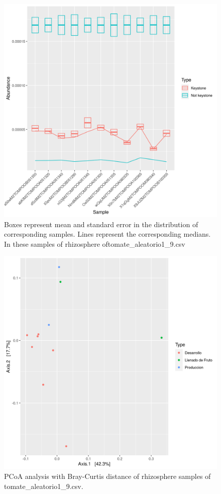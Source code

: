 \begin{figure}
 \centering
 \includegraphics[scale = 0.75]{mean_median_key_vs_not_key_tomate_aleatorio1_9.csv.png}
\caption{Boxes represent mean and standard error in the distribution of corresponding samples. Lines represent the corresponding medians. In these samples of rhizosphere oftomate_aleatorio1_9.csv}
\label{mean_median_tomate_aleatorio1_9.csv}
\end{figure}
\begin{figure}
   \centering
   \includegraphics[scale = 0.7]{pcoa_muestras_tomate_aleatorio1_9.csv.png}
 \caption{PCoA analysis with Bray-Curtis distance of rhizosphere samples of tomate_aleatorio1_9.csv.}
 \label{fig:tomate_aleatorio1_9.csv_pcoa}
\end{figure}

